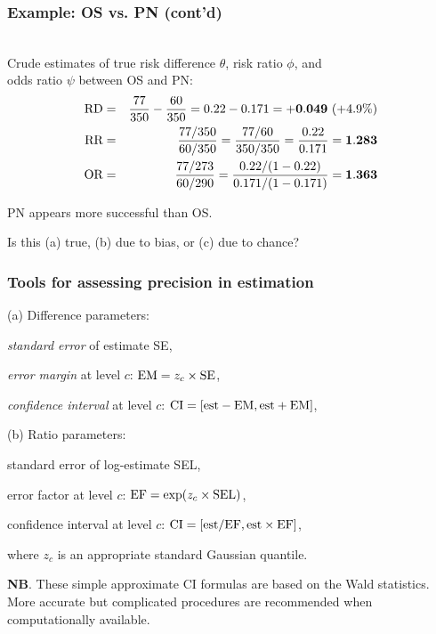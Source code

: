 \documentclass[handout,12pt]{beamer}
\begin{document}
\begin{frame}[fragile] \frametitle{Example: OS vs. PN (cont'd)}
\ \\
Crude estimates of true risk difference $\theta$, risk ratio $\phi$, and \\ odds ratio $\psi$ between OS and PN:
\begin{eqnarray*}
\text{\rm RD} & = & \frac{77}{350} - \frac{60}{350} = 0.22 - 0.171 = 
        + {\bf 0.049} \ (+ 4.9\%)\\
\text{\rm RR} & = & \frac{77/350}{60/350} = \frac{77/60}{350/350} = \frac{0.22}{0.171} = {\bf 1.283}\\
\text{\rm OR} & = & \frac{77/273}{60/290} = \frac{0.22/(1 - 0.22)}{0.171/(1 - 0.171)} = {\bf 1.363}
\end{eqnarray*}

PN appears more successful than OS.

Is this (a) true, (b) due to bias, or (c) due to chance?
\end{frame}



\begin{frame}[fragile] \frametitle{Tools for assessing precision in estimation}

(a) Difference parameters:
\bi
\item {\it standard error} of estimate SE,
\item {\it error margin} at level $c$: $\text{\rm EM} = z_c \times \text{\rm SE}$,
\item {\it confidence interval} at level $c$: $\text{\rm CI} = [\text{est}-\text{\rm EM}, \text{est}+\text{\rm EM}]$,
\ei

(b) Ratio parameters:
\bi
\item standard error of log-estimate SEL,
\item error factor at level $c$: $\text{\rm EF} = \text{exp}(z_c \times \text{\rm SEL})$,
\item confidence interval at level $c$: $\text{\rm CI} = [\text{est}/\text{\rm EF}, \text{est} \times \text{\rm EF}]$,
\ei

where $z_c$ is an appropriate standard Gaussian quantile.

{\bf NB}. These simple approximate CI formulas are based on the Wald statistics.  More accurate but complicated procedures are recommended when computationally available.
\end{frame}

\end{document}
